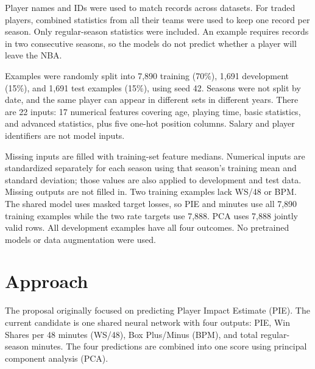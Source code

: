 \documentclass{article}
\begin{document}
Player names and IDs were used to match records across datasets. For traded
players, combined statistics from all their teams were used to keep one record
per season. Only regular-season statistics were included. An example requires
records in two consecutive seasons, so the models do not predict whether a
player will leave the NBA.

Examples were randomly split into 7,890 training (70\%), 1,691 development
(15\%), and 1,691 test examples (15\%), using seed 42. Seasons were not split by
date, and the same player can appear in different sets in different years. There
are 22 inputs: 17 numerical features covering age, playing time, basic statistics,
and advanced statistics, plus five one-hot position columns. Salary and player
identifiers are not model inputs.

Missing inputs are filled with training-set feature medians. Numerical inputs
are standardized separately for each season using that season's training mean
and standard deviation; those values are also applied to development and test
data. Missing outputs are not filled in. Two training examples lack WS/48 or BPM.
The shared model uses masked target losses, so PIE and minutes use all 7,890
training examples while the two rate targets use 7,888. PCA uses 7,888 jointly
valid rows. All development examples have all four outcomes. No pretrained
models or data augmentation were used.

\section{Approach}
The proposal originally focused on predicting Player Impact Estimate (PIE).
The current candidate is one shared neural network with four outputs: PIE,
Win Shares per 48 minutes (WS/48), Box Plus/Minus (BPM), and total regular-season
minutes. The four predictions are combined into one score using principal
component analysis (PCA).
\end{document}
